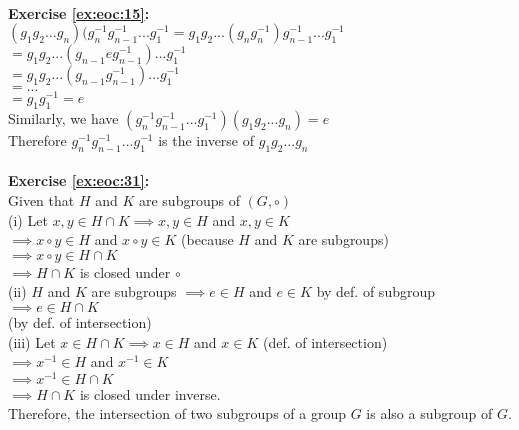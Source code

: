\\
\textbf{Exercise \ref{ex:eoc:15}:}\\
$(g_1g_2...g_n)(g_n^{-1}g_{n-1}^{-1}...g_1^{-1}=g_1g_2...(g_ng_n^{-1})g_{n-1}^{-1}...g_1^{-1}$\\
$=g_1g_2...(g_{n-1}eg_{n-1}^{-1})...g_1^{-1}$\\
$=g_1g_2...(g_{n-1}g_{n-1}^{-1})...g_1^{-1}$\\
$=...$\\
$=g_1g_1^{-1}=e$\\
Similarly, we have $(g_n^{-1}g_{n-1}^{-1}...g_1^{-1})(g_1g_2...g_n)=e$\\
Therefore $g_n^{-1}g_{n-1}^{-1}...g_1^{-1}$ is the inverse of $g_1g_2...g_n$\\
\\
\textbf{Exercise \ref{ex:eoc:31}:}\\
Given that $H$ and $K$ are subgroups of $(G,\circ)$\\
(i) Let $x,y\in H\cap K \implies x,y\in H$ and $x,y\in K$\\
$\implies x\circ y\in H$ and $x\circ y\in K$ (because $H$ and $K$ are subgroups)\\
$\implies x\circ y\in H\cap K$\\
$\implies H\cap K$ is closed under $\circ$\\
(ii) $H$ and $K$ are subgroups $\implies e\in H$ and $e\in K$ by def. of subgroup\\
$\implies e\in H\cap K$\\ (by def. of intersection)\\
(iii) Let $x\in H\cap K \implies x\in H$ and $x\in K$ (def. of intersection)\\
$\implies x^{-1}\in H$ and $x^{-1}\in K$\\
$\implies x^{-1}\in H\cap K$\\
$\implies H\cap K$ is closed under inverse.\\
Therefore, the intersection of two subgroups of a group $G$ is also a subgroup of $G$.\\